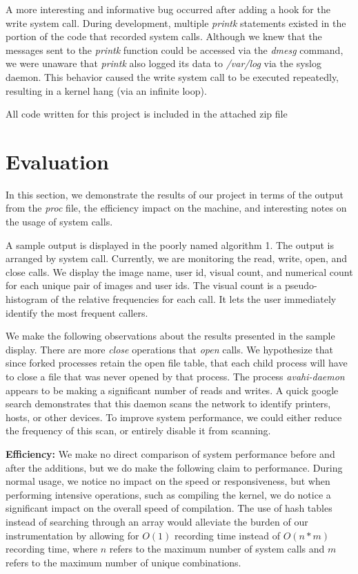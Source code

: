 \documentclass[conference]{IEEEtran}
\begin{document}
A more interesting and informative bug occurred after adding a hook for the write system call.
During development, multiple \textit{printk} statements existed in the portion of the code that recorded system calls.
Although we knew that the messages sent to the \textit{printk} function could be accessed via the \textit{dmesg} command, we were unaware that \textit{printk} also logged its data to \textit{/var/log} via the syslog daemon.
This behavior caused the write system call to be executed repeatedly, resulting in a kernel hang (via an infinite loop).

All code written for this project is included in the attached zip file

\section{Evaluation}
\label{sec:evaluation}
In this section, we demonstrate the results of our project in terms of the output from the \textit{proc} file, the efficiency impact on the machine, and interesting notes on the usage of system calls.

A sample output is displayed in the poorly named algorithm 1.
The output is arranged by system call.  Currently, we are monitoring the read, write, open, and close calls.
We display the image name, user id, visual count, and numerical count for each unique pair of images and user ids.
The visual count is a pseudo-histogram of the relative frequencies for each call.
It lets the user immediately identify the most frequent callers.

We make the following observations about the results presented in the sample display.
There are more \textit{close} operations that \textit{open} calls.
We hypothesize that since forked processes retain the open file table, that each child process will have to close a file that was never opened by that process.
The process \textit{avahi-daemon} appears to be making a significant number of reads and writes.
A quick google search demonstrates that this daemon scans the network to identify printers, hosts, or other devices.
To improve system performance, we could either reduce the frequency of this scan, or entirely disable it from scanning.

\textbf{Efficiency:} We make no direct comparison of system performance before and after the additions, but we do make the following claim to performance.
During normal usage, we notice no impact on the speed or responsiveness, but when performing intensive operations, such as compiling the kernel, we do notice a significant impact on the overall speed of compilation.
The use of hash tables instead of searching through an array would alleviate the burden of our instrumentation by allowing for $O(1)$ recording time instead of $O(n*m)$ recording time, where $n$ refers to the maximum number of system calls and $m$ refers to the maximum number of unique combinations.
\end{document}
